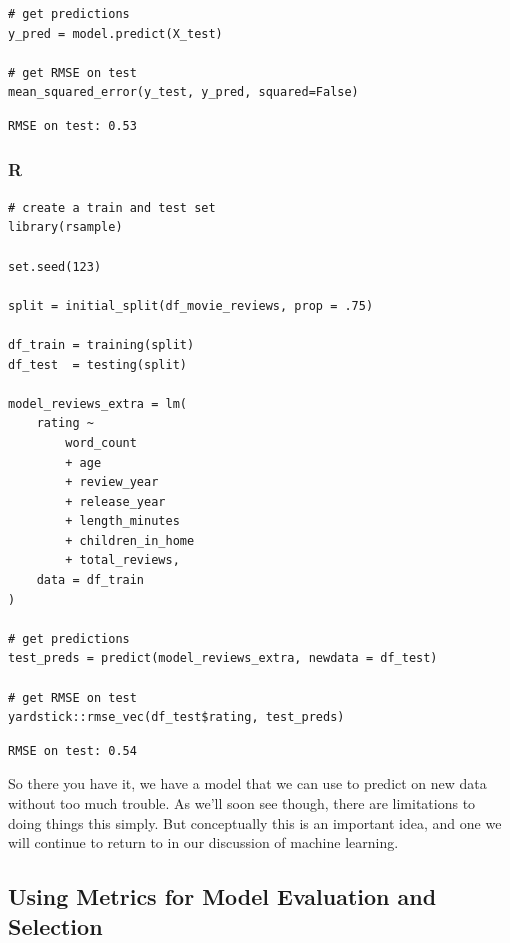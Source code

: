 \documentclass[
  letterpaper,
]{krantz}
\begin{document}
\begin{verbatim}
# get predictions
y_pred = model.predict(X_test)

# get RMSE on test
mean_squared_error(y_test, y_pred, squared=False)
\end{verbatim}

\begin{verbatim}
RMSE on test: 0.53
\end{verbatim}

\subsubsection{R}

\begin{verbatim}
# create a train and test set
library(rsample)

set.seed(123)

split = initial_split(df_movie_reviews, prop = .75)

df_train = training(split)
df_test  = testing(split)

model_reviews_extra = lm(
    rating ~
        word_count
        + age
        + review_year
        + release_year
        + length_minutes
        + children_in_home
        + total_reviews,
    data = df_train
)

# get predictions
test_preds = predict(model_reviews_extra, newdata = df_test)

# get RMSE on test
yardstick::rmse_vec(df_test$rating, test_preds)
\end{verbatim}

\begin{verbatim}
RMSE on test: 0.54
\end{verbatim}

So there you have it, we have a model that we can use to predict on new
data without too much trouble. As we'll soon see though, there are
limitations to doing things this simply. But conceptually this is an
important idea, and one we will continue to return to in our discussion
of machine learning.

\subsection{Using Metrics for Model Evaluation and
Selection}\label{using-metrics-for-model-evaluation-and-selection}
\end{document}

